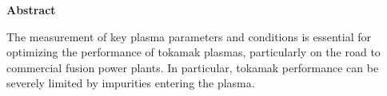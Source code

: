 \newpage
\thispagestyle{empty}
\begin{center}

  \vspace*{1cm}
  \textbf{\large Abstract}
\end{center}
The measurement of key plasma parameters and conditions is essential for optimizing the performance of tokamak plasmas, particularly on the road to commercial fusion power plants. In particular, tokamak performance can be severely limited by impurities entering the plasma. 

\tableofcontents
\listoffigures
\listoftables
\clearpage












